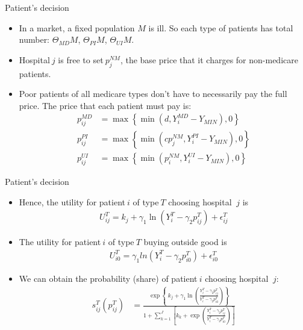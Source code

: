 \documentclass[aspectratio=169]{beamer}  %
\begin{document}
\begin{frame}{Patient's decision}
    \begin{itemize}
        \item  In a market, a fixed population $M$ is ill. So each type of patients has total number: $\Theta_{MD}M$, $\Theta_{PI}M$, $\Theta_{UI}M$. 
        \item Hospital$\ j$ is free to set$\ p_j^{NM}$, the base price that it charges for non-medicare patients.
        \item Poor patients of all medicare types don't have to necessarily pay the full price. The price that each patient must pay is:
        \begin{align*}
        p_{ij}^{MD} &= \max\left\{\min\left(d, Y_{i}^{MD}- Y_{MIN}\right), 0\right\} \\
        p_{ij}^{PI} &= \max\left\{\min\left(cp_{j}^{NM}, Y_{i}^{PI} - Y_{MIN}\right), 0\right\} \\
        p_{ij}^{UI} &= \max\left\{\min\left(p_{i}^{NM}, Y_{i}^{UI} - Y_{MIN}\right), 0\right\}
        \end{align*}
        
    \end{itemize}

\end{frame}

\begin{frame}{Patient's decision}
    \begin{itemize}
        \item  Hence, the utility for patient$\ i$ of type$
        \ T$ choosing hospital $\ j$ is
        \begin{align*}
        U_{ij}^{T} = k_j + \gamma_1 \ln (Y_i^T-\gamma_2 p_{ij}^T)+ \epsilon_{ij}^T  
        \end{align*}
        \item  The utility for patient$\ i$ of type$
        \ T$ buying outside good is
        \begin{align*}
        U_{i0}^{T} = \gamma_1 ln (Y_i^T-\gamma_2 p_{i0}^T)+ \epsilon_{i0}^T  
        \end{align*}
        \item We can obtain the probability (share) of patient$\ i$ choosing hospital $\ j$:
        \begin{align*}
         s_{ij}^{T}(p_{ij}^{T}) &= \frac{\exp\left\{\ k_j + \gamma_1 \ln (\frac{Y_i^T-\gamma_2 p_{ij}^T}{Y_i^T-\gamma_2 p_{i0}^T})\right\}}{1+\sum_{k=1}^J [k_k+\exp(\frac{Y_i^T-\gamma_2 p_{ij}^T}{Y_i^T-\gamma_2 p_{i0}^T})]}
        \end{align*}
    
        
    \end{itemize}

\end{frame}
\end{document}
